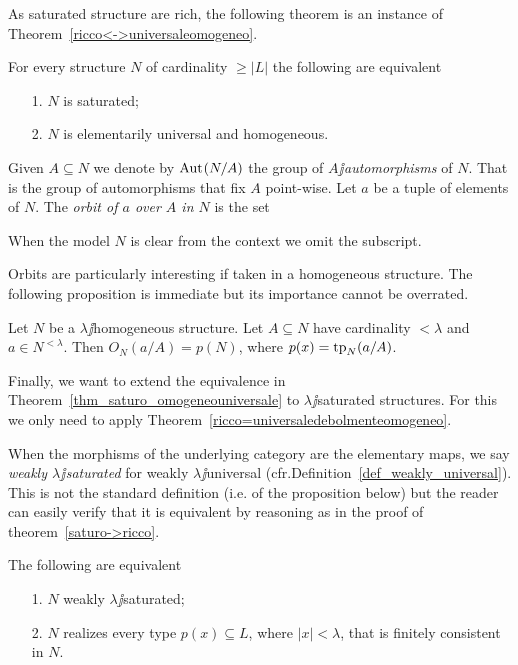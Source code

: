 \documentclass[creche.tex]{subfiles}
\begin{document}
As saturated structure are rich, the following theorem is an instance of Theorem~\ref{ricco<->universaleomogeneo}.

\begin{theorem}\label{thm_saturo_omogeneouniversale}
For every structure $N$ of cardinality $\ge|L|$ the following are equivalent\nobreak
\begin{itemize}
\item[1.] $N$ is saturated;
\item[2.] $N$ is elementarily universal and homogeneous.\QED
\end{itemize}
\end{theorem}

Given $A\subseteq N$ we denote by \emph{$\textrm{Aut\kern.15ex}(N/A)$\/} the group of \emph{$A\jj$automorphisms\/} of $N$. That is the group of automorphisms that fix $A$ point-wise. Let $a$ be a tuple of elements of $N$. The \emph{orbit of $a$ over $A$ in $N$} is the set


When the model $N$ is clear from the context we omit the subscript.

Orbits are particularly interesting if taken in a homogeneous structure. The following proposition is immediate but its importance cannot be overrated.

\begin{proposition}\label{omogeneitaorbitetipi}
Let $N$ be a $\lambda\jj$homogeneous structure. Let $A\subseteq N$ have cardinality $<\lambda$ and $a\in N^{<\lambda}$. Then $O_N(a/A)=p(N)$, where $p(x)={\rm tp}_N(a/A)$.\QED
\end{proposition}


Finally, we want to extend the equivalence in Theorem~\ref{thm_saturo_omogeneouniversale} to $\lambda\jj$saturated structures. For this we only need to apply Theorem~\ref{ricco=universaledebolmenteomogeneo}. 

When the morphisms of the underlying category are the elementary maps, we say \emph{weakly $\lambda\jj$saturated} for weakly $\lambda\jj$universal (cfr.\@ Definition~\ref{def_weakly_universal}). This is not the standard definition (i.e.\@ {} of the proposition below) but the reader can easily verify that it is equivalent by reasoning as in the proof of theorem~\ref{saturo->ricco}.

\begin{proposition}\label{prop_w_saturation}
The following are equivalent
\begin{itemize}
\item[1.] $N$ weakly $\lambda\jj$saturated;
\item[2.] $N$ realizes every type $p(x)\subseteq L$, where $|x|<\lambda$, that is finitely consistent in $N$.\QED
\end{itemize}
\end{proposition}
\end{document}

